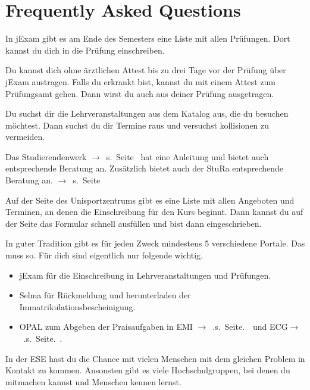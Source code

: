 \chapter*{Frequently Asked Questions}
\label{sec:faq}
In jExam  gibt es am Ende des Semesters eine Liste mit allen Prüfungen. Dort kannst du dich in die Prüfung einschreiben.

Du kannst dich ohne ärztlichen Attest bis zu drei Tage vor der Prüfung über jExam austragen. Falls du erkrankt bist, kannst du mit einem Attest zum Prüfungsamt gehen. Dann wirst du auch aus deiner Prüfung ausgetragen.

Du suchst dir die Lehrveranstaltungen aus dem Katalog aus, die du besuchen möchtest. Dann suchst du dir Termine raus und versuchst kollisionen zu vermeiden.

Das Studierendenwerk $\rightarrow$~s.~Seite~\pageref{sec:stuwe} hat eine Anleitung und bietet auch entsprechende Beratung an. Zusätzlich bietet auch der StuRa entsprechende Beratung an. $\rightarrow$~s.~Seite~\pageref{sec:stura}

Auf der Seite des Unisportzentrums gibt es eine Liste mit allen Angeboten und Terminen, an denen die Einschreibung für den Kurs beginnt. Dann kannst du auf der Seite das Formular schnell ausfüllen und bist dann eingeschrieben.

In guter Tradition gibt es für jeden Zweck mindestens 5 verschiedene Portale. Das muss so. Für dich sind eigentlich nur folgende wichtig.
\begin{itemize}
\item jExam für die Einschreibung in Lehrveranstaltungen und Prüfungen.
\item Selma für Rückmeldung und herunterladen der Immatrikulationsbescheinigung.
\item OPAL zum Abgeben der Praisaufgaben in EMI $\rightarrow$~.s.~Seite.~\pageref{lec:emi}~und ECG$\rightarrow$~.s.~Seite.~\pageref{lec:ecg}.
\end{itemize}
In der ESE hast du die Chance mit vielen Menschen mit dem gleichen Problem in Kontakt zu kommen. Ansonsten gibt es viele Hochschulgruppen, bei denen du mitmachen kannst und Menschen kennen lernst.

